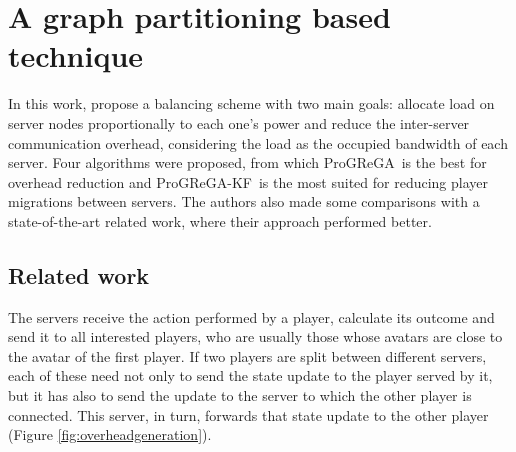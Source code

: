 \newcommand{\ggp}{ProGReGA}
\newcommand{\ggpmeaning}{proportional greedy region growing algorithm}
\newcommand{\ggpk}{\mbox{\ggp-KH}}
\newcommand{\ggpkmeaning}{proportional greedy region growing algorithm keeping heaviest cell}
\newcommand{\ggpf}{\ggp-KF}
\newcommand{\ggpfmeaning}{proportional greedy region growing algorithm keeping usage fraction}
\newcommand{\bfa}{BFBCT}
\newcommand{\bfameaning}{best-fit based cell transference}
\newcommand{\kl}{Kernighan-Lin}
\newcommand{\klalg}{Kernighan-Lin}
\newcommand{\wtodiv}{weight\_to\_divide}
\newcommand{\freecap}{free\_capacity}
\newcommand{\rlist}{region\_list}
\newcommand{\clist}{cell\_list}
\newcommand{\locgroup}{local\_group}
\newcommand{\avguse}{average\_usage}
\newcommand{\wlocal}{local\_weight}
\newcommand{\caplocal}{local\_capacity}
\newcommand{\wshare}{weight\_share}
\newcommand{\wlose}{weight\_to\_lose}
\newcommand{\destreg}{destination\_regions}
\newcommand{\regcap}{free\_capacity}
\newcommand{\wtoreg}{weight\_to\_this\_region}
\newcommand{\misccite}[2]{Available at: #2}
\newcommand{\gamecite}[2]{Available at: #2}

\chapter{A graph partitioning based technique}

In this work, \cite{bezerra2009lbs} propose a balancing scheme with two main goals: allocate load on server nodes proportionally to each one's power and reduce the inter-server communication overhead, considering the load as the occupied bandwidth of each server. Four algorithms were proposed, from which \ggp\ is the best for overhead reduction and \ggpf\ is the most suited for reducing player migrations between servers. The authors also made some comparisons with a state-of-the-art related work, where their approach performed better.

\section{Related work}
\label{sec:related}

The servers receive the action performed by a player, calculate its outcome and send it to all interested players, who are usually those whose avatars are close to the avatar of the first player. If two players are split between different servers, each of these need not only to send the state update to the player served by it, but it has also to send the update to the server to which the other player is connected. This server, in turn, forwards that state update to the other player (Figure \ref{fig:overheadgeneration}).

